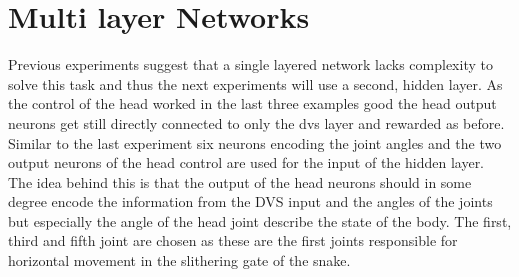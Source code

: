 \section{Multi layer Networks}
Previous experiments suggest that a single layered network lacks complexity to solve this task and thus the next experiments will use a second, hidden layer. As the control of the head worked in the last three examples good the head output neurons get still directly connected to only the dvs layer and rewarded as before. Similar to the last experiment six neurons encoding the joint angles and the two output neurons of the head control are used for the input of the hidden layer. The idea behind this is that the output of the head neurons should in some degree encode the information from the DVS input and the angles of the joints but especially the angle of the head joint describe the state of the body. The first, third and fifth joint are chosen as these are the first joints responsible for horizontal movement in the slithering gate of the snake.

